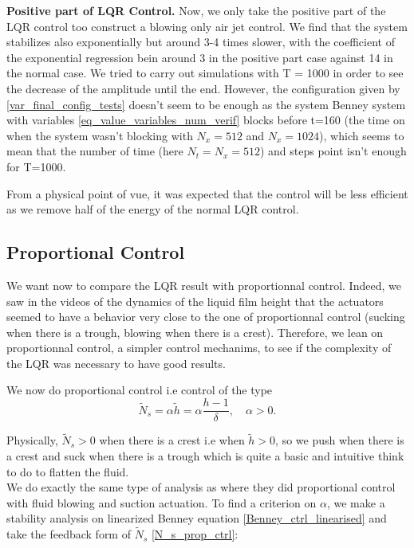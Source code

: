 \documentclass[12pt]{article}
\begin{document}
\textbf{Positive part of LQR Control.}
Now, we only take the positive part of the LQR control too construct a blowing only air jet control.
We find that the system stabilizes also exponentially but around 3-4 times slower, with the coefficient 
of the exponential regression bein around 3 in the positive part case against 14 in the normal case. We 
tried to carry out simulations with T = 1000 in order to see the decrease of the amplitude until the
end. However, the configuration given by \eqref{var_final_config_tests} doesn't seem to be enough as the 
system Benney system with variables \eqref{eq_value_variables_num_verif} blocks before t=160 (the time on when
the system wasn't blocking with $N_x =512$ and $N_x=1024$), which seems to mean that the number of 
time (here $N_t = N_x = 512$) and steps point isn't enough for T=1000. 

From a physical point of vue, it was expected that the control will be less efficient as we remove half 
of the energy of the normal LQR control. 


\subsection{Proportional Control}
We want now to compare the LQR result with proportionnal control. Indeed, we saw in the videos of the dynamics 
of the liquid film height that the actuators seemed to have a behavior very close to the one of proportionnal 
control (sucking when there is a trough, blowing when there is a crest). Therefore, we lean on proportionnal control,
a simpler control mechanims, to see if the complexity of the LQR was necessary to have good results.

We now do proportional control i.e control of the type 
\begin{equation}\label{N_s_prop_ctrl}
    \tilde{N}_s = \alpha\tilde{h} = \alpha \frac{h-1}{\delta}, \quad \alpha >0.
\end{equation}

Physically, $\tilde{N}_s >0$ when there is a crest i.e when $\tilde{h}>0$, so we push when there is a crest and suck when there is a trough which is quite a basic and intuitive think to do to flatten the fluid. 
\\

 We do exactly the same type of analysis as \cite{Thompson_2016_prop_ctrl} where they did proportional control with fluid blowing and suction actuation. To find a criterion on $\alpha$, we make a stability analysis on linearized Benney equation \eqref{Benney_ctrl_linearised} and take the feedback form of $\tilde{N}_s$ \eqref{N_s_prop_ctrl}:  
\end{document}
